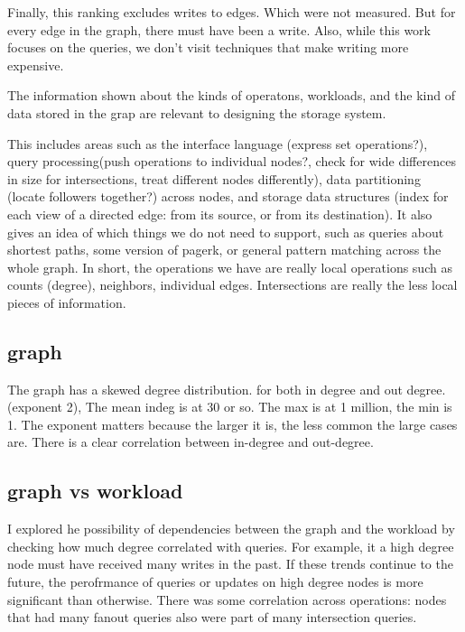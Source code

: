 \documentclass[11pt]{article}
\begin{document}
Finally, this ranking excludes writes to edges. Which were not measured. But for every edge in the graph, there must have been a write. Also, while this work focuses on the queries, we don't visit techniques that make writing more expensive.

The information shown about the kinds of operatons, workloads, and the kind of data stored in the grap are relevant to designing the storage system. 

This includes  areas such as the interface language (express set operations?), query processing(push operations to individual nodes?, check for wide differences in size for intersections, treat different nodes differently), data partitioning (locate followers together?) across nodes, and storage data structures (index for each view of a directed edge: from its source, or  from its destination). It also gives an idea of which things we do not need to support, such as queries about shortest paths, some version of pagerk, or general pattern matching across the whole graph. In short, the operations we have are really local operations such as counts (degree), neighbors, individual edges. Intersections are really the less local pieces of information.

\subsection{graph}
The graph has a skewed degree distribution. for both in degree and out degree.(exponent 2),  The mean indeg is at 30 or so. The max is at 1 million, 
the min is 1. The exponent matters because the larger it is, the less common the large cases are.  There is a clear correlation between in-degree and out-degree. 



\subsection{graph vs workload}
I explored he possibility of dependencies between the graph and the workload by checking how much degree correlated with queries.
For example, it a high degree node must have received many writes in the past. If these trends continue to the future, the perofrmance of 
queries or updates on high degree nodes is more significant than otherwise.  There was  some correlation across operations: nodes that had many 
fanout queries also were part of many intersection queries.
\end{document}
